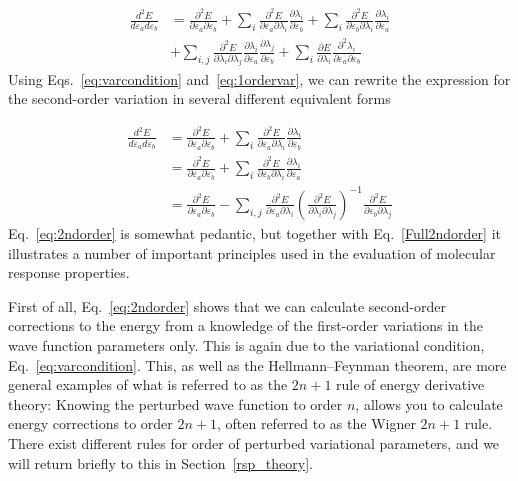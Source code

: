 \documentclass[%
 reprint,
 amsmath,amssymb,
 aps,
]{revtex4-1}
\begin{document}
\begin{align}
  \frac{d^2E}{d\varepsilon_a d\varepsilon_b} &= \frac{\partial^2
    E}{\partial\varepsilon_a\partial\varepsilon_b} +
  \sum_i\frac{\partial^2E}{\partial\varepsilon_a\partial\lambda_i}\frac{\partial\lambda_i}{\partial\varepsilon_b}
  +
  \sum_i\frac{\partial^2E}{\partial\varepsilon_b\partial\lambda_i}\frac{\partial\lambda_i}{\partial\varepsilon_a}\nonumber\\
  &+
  \sum_{i,j}\frac{\partial^2E}{\partial\lambda_i\partial\lambda_j}\frac{\partial\lambda_i}{\partial\varepsilon_a}\frac{\partial\lambda_j}{\partial\varepsilon_b}
  + \sum_i\frac{\partial
    E}{\partial\lambda_i}\frac{\partial^2\lambda_i}{\partial\varepsilon_a\partial\varepsilon_b}\label{eq:Full2ndorder}
\end{align}
Using Eqs.~\eqref{eq:varcondition} and~\eqref{eq:1ordervar}, we can
rewrite the expression for the second-order variation in several
different equivalent forms

\begin{align}
\frac{d^2E}{d\varepsilon_a d\varepsilon_b} &= \frac{\partial^2
    E}{\partial\varepsilon_a\partial\varepsilon_b} +
\sum_i\frac{\partial^2E}{\partial\varepsilon_a\partial\lambda_i}\frac{\partial\lambda_i}{\partial\varepsilon_b}\nonumber\\
 &= \frac{\partial^2
  E}{\partial\varepsilon_a\partial\varepsilon_b} +
\sum_i\frac{\partial^2E}{\partial\varepsilon_b\partial\lambda_i}\frac{\partial\lambda_i}{\partial\varepsilon_a}\label{eq:2ndorder}\\ 
 &= \frac{\partial^2
  E}{\partial\varepsilon_a\partial\varepsilon_b} -
\sum_{i,j}\frac{\partial^2
  E}{\partial\varepsilon_a\partial\lambda_i}\left(\frac{\partial^2
E}{\partial\lambda_i\partial\lambda_j}\right)^{-1}\frac{\partial^2 
  E}{\partial\varepsilon_b\partial\lambda_j}\nonumber
\end{align}
Eq.~\eqref{eq:2ndorder} is somewhat pedantic, but together with
Eq.~\eqref{Full2ndorder} it illustrates a number of important
principles used in the evaluation of molecular response properties.

First of all, Eq.~\eqref{eq:2ndorder} shows that we can calculate
second-order corrections to the energy from a knowledge of the
first-order variations in the wave function parameters only. This is
again due to the variational condition, Eq.~\eqref{eq:varcondition}. This, as
well as the Hellmann--Feynman theorem, are more general examples of
what is referred to as the $2n+1$ rule of energy derivative theory:
Knowing the perturbed wave function to order $n$, allows you to
calculate energy corrections to order $2n+1$, often referred to as the
Wigner $2n+1$ rule.~\cite{Hylleraas1930,Wigner1930} There exist
different rules for order of perturbed variational parameters, and we
will return briefly to this in Section~\ref{rsp_theory}.
\end{document}
